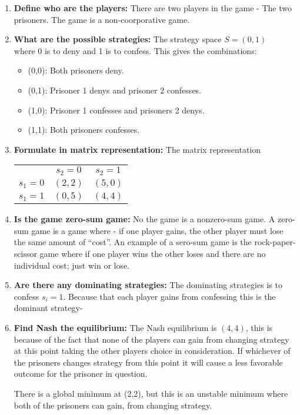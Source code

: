 \begin{enumerate}
\item \textbf{Define who are the players:} There are two players in the game - The two prisoners. The game is a
  non-coorporative game.
\item \textbf{What are the possible strategies:} The strategy space $S = (0,1)$ \\
  where 0 is to deny and 1 is to confess. This gives the combinations:
  \begin{itemize}\tightlist
  \item (0,0): Both prisoners deny.
  \item (0,1): Prisoner 1 denys and prisoner 2 confesses.
  \item (1,0): Prisoner 1 confesses and prisoners 2 denys.
  \item (1,1): Both prisoners confesses.
  \end{itemize}
\item \textbf{Formulate in matrix representation:} The matrix representation
  \begin{center}
    \begin{tabular}{ r|c|c| }
      \multicolumn{1}{r}{}
      & \multicolumn{1}{c}{$s_2 = 0$}
      & \multicolumn{1}{c}{$s_2 = 1$}                                   \\
      \cline{2-3}
      $s_1 = 0$ & $(2,2)$ & $(5,0)$                                               \\
      \cline{2-3}
      $s_1 = 1$ & $(0,5)$ & $(4,4)$                                               \\
      \cline{2-3}
    \end{tabular}
  \end{center}
\item \textbf{Is the game zero-sum game:} No the game is a nonzero-sum game. A zero-sum game is a game where - if one
  player gains, the other player must lose the same amount of ``cost''. An example of a sero-sum game is the
  rock-paper-scissor game where if one player wins the other loses and there are no individual cost; just win or lose.
\item \textbf{Are there any dominating strategies:} The dominating strategies is to confess $s_i = 1$. Because that each
  player gains from confessing this is the dominant strategy-
\item \textbf{Find Nash the equilibrium:} The Nash equilibrium is $(4,4)$, this is because of the fact that none of the
  players can gain from changing strategy at this point taking the other players choice in consideration. If whichever of
  the prisoners changes strategy from this point it will cause a less favorable outcome for the prisoner in question.

  There is a global minimum at (2,2), but this is an unstable minimum where both of the prisoners can gain, from
  changing strategy.
\end{enumerate}
